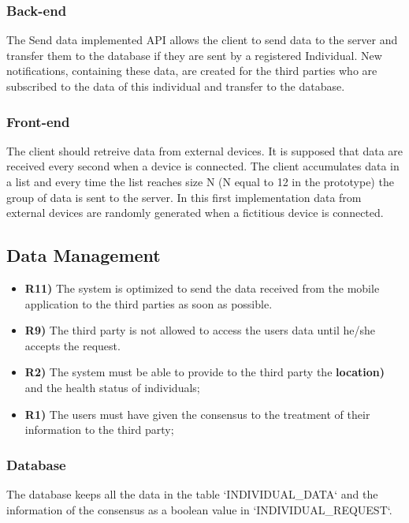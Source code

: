 \subsubsection*{Back-end}
The Send data implemented API allows the client to send data to the server and transfer them to the database if they are sent by a registered Individual.
New notifications, containing these data, are created for the third parties who are subscribed to the data of this individual and transfer to the database.

\subsubsection*{Front-end}
The client should retreive data from external devices. It is supposed that data are received every second when a device is connected. The client accumulates data in a list and every time the list reaches size N (N equal to 12 in the prototype) the group of data is sent to the server.
In this first implementation data from external devices are randomly generated when a fictitious device is connected.


\subsection{Data Management}
\begin{itemize}	
	\item {\color{Green}\textbf{R11)}} The system is optimized to send the data received from the mobile application to the third parties as soon as possible.
	\item {\color{Green}\textbf{R9)}} The third party is not allowed to access the users data until he/she accepts the request.
	\item {\color{Green}\textbf{R2)}} The system must be able to provide to the third party the {\color{Red}\textbf{location)}} and the health status of individuals;
	\item {\color{Green}\textbf{R1)}} The users must have given the consensus to the treatment of their information to the third party;
\end{itemize}

\subsubsection*{Database}
The database keeps all the data in the table `INDIVIDUAL\_DATA` and the information of the consensus as a boolean value in `INDIVIDUAL\_REQUEST`.

